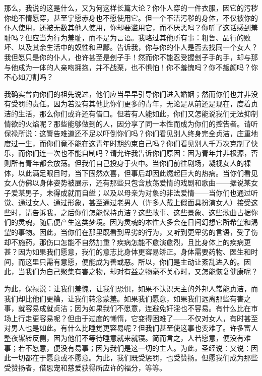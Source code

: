 那么，我说的这是什么，又为何这样长篇大论？你仆人穿的一件衣服，因它的污秽你绝不情愿穿，甚至宁愿赤身也不愿使用它。但一个不洁污秽的身体，不仅被你的仆人使用，还被无数其他人使用，你却要滥用它，而不厌恶吗？你听了这话感到羞耻吗？但应当为行为羞耻，而不是为言语。我略过其他所有事：粗鲁、品行的败坏、以及其余生活中的奴性和卑鄙。告诉我，你与你的仆人是否去找同一个女人？我但愿只是你的仆人，也许甚至是刽子手！然而你不能忍受握刽子手的手，却与那与他成为一体的人亲吻拥抱，并不战栗，也不惧怕！你不羞愧吗？你不赧颜吗？你不心如刀割吗？\par

我确实曾向你们的祖先说过，他们应当早早引导你们进入婚姻；然而你们也并非没有受罚的责任。因为若没有其他比你们更多的青年，无论是从前还是现在，度着贞洁的生活，那么你们或许还有借口。但若有人能如此，你们又怎能说我们无法抑制情欲的火焰呢？那些能够做到的人，因分享了同一本性而成为你们的控告者。请听保禄所说：这警告难道还不足以吓倒你们吗？你们看见别人终身完全贞洁，庄重地度过一生，而你们竟不能在这青年时期约束自己吗？你们看见别人千万次克制了快乐，而你们连一次也不能自制吗？请允许我告诉你们原因：因为青年并非根源，否则所有青年都会放荡。但我们自己投身于火中。当你们前往剧场，凝视女人的裸体，以此满足眼目时，当下固然欢喜，但事后却因此燃起巨大的热病。当你们看见女人仿佛以身体姿势被展示，还有那些只包含放荡爱情的戏剧和歌曲——据说某女子爱某男子，未得成就而自缢；以及以母亲为对象的非法爱情——当你们也通过听觉、通过女人、通过形象，甚至通过老男人（许多人戴上假面具扮演女人）接受这些时，请告诉我，之后你们怎能保持贞洁？这些故事、这些景象、这些歌曲占据你们的灵魂，随后便产生这类梦境。因为灵魂的本性大多会在日间幻想它所希望和渴望的事物。因此，当你们在那里既看到卑劣的行为，又听到更卑劣的言语，受了伤却不施药，那伤口怎能不自然加重？疾病怎能不愈演愈烈，且比身体上的疾病更甚？因为如果我们愿意，我们的意志比身体更容易矫正。身体需要药物、医生和时间，而这里只需有意愿，便能成为善或恶。所以，你们是主动让紊乱进入的。因此，当我们为自己聚集有害之物，却对有益之物毫不关心时，又怎能恢复健康呢？\par

为此，保禄说：让我们羞愧，让我们恐惧，如果不认识天主的外邦人常能贞洁，而我们却比他们更糟，让我们转念蒙羞。如果我们愿意，如果我们远离那些有害之事，就容易成就贞洁；因为如果我们不愿意，连避免奸淫也不容易。有什么比在市场上行走更容易呢？但由于过度的懒惰，它变得困难了——不仅对女人，有时甚至对男人也是如此。有什么比睡觉更容易呢？但我们甚至使这事也变难了。许多富人整夜辗转反侧，因为他们不等待睡意就来就寝。简而言之，人若愿意，便没有难事；若不愿意，便没有易事；因为我们是这一切的主人。为此，圣经说：又说：因此一切都在于愿意或不愿意。为此，我们既受惩罚，也受赞扬。但愿我们成为那些受赞扬者，借恩宠和慈爱获得所应许的福分，等等。\par

